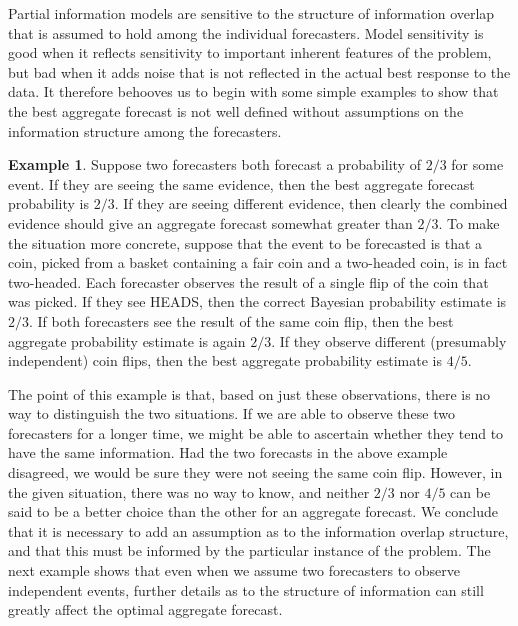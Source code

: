 \documentclass[11pt]{article}
\theoremstyle{definition}
\newtheorem{example}[theorem]{Example}
\theoremstyle{definition}
\begin{document}
Partial information models are sensitive to the structure of 
information overlap that is assumed to hold among the individual 
forecasters.  Model sensitivity is good when it reflects
sensitivity to important inherent features of the problem,
but bad when it adds noise that is not reflected in the
actual best response to the data.  It therefore behooves
us to begin with some simple examples to show that the best
aggregate forecast is not well defined without assumptions
on the information structure among the forecasters.

\begin{example}
\label{FirstExample}
Suppose two forecasters both forecast a probability of $2/3$ for
some event.  If they are seeing the same evidence, then the best
aggregate forecast probability is $2/3$.  If they are seeing
different evidence, then clearly the combined evidence should give
an aggregate forecast somewhat greater than $2/3$.  To make the
situation more concrete, suppose that the event to be forecasted is that
a coin, picked from a basket containing a fair coin and a two-headed
coin, is in fact two-headed.  Each forecaster observes the result
of a single flip of the coin that was picked.  If they see HEADS,
then the correct Bayesian probability estimate is $2/3$.  If both
forecasters see the result of the same coin flip, then the best
aggregate probability estimate is again $2/3$.  If they observe
different (presumably independent) coin flips, then the best
aggregate probability estimate is $4/5$.  
\end{example}

The point of this example is that, based on just these observations, 
there is no way to distinguish the two situations.  If we are able
to observe these two forecasters for a longer time, we might be
able to ascertain whether they tend to have the same information.
Had the two forecasts in the above example disagreed, we would be
sure they were not seeing the same coin flip.  However, in the given
situation, there was no way to know, and neither $2/3$ nor $4/5$ 
can be said to be a better choice than the other for an aggregate
forecast.  We conclude that it is necessary to add an assumption
as to the information overlap structure, and that this must be
informed by the particular instance of the problem. The next example shows that even when we assume two forecasters to observe
independent events, further details as to the structure of information
can still greatly affect the optimal aggregate forecast.  
\end{document}

